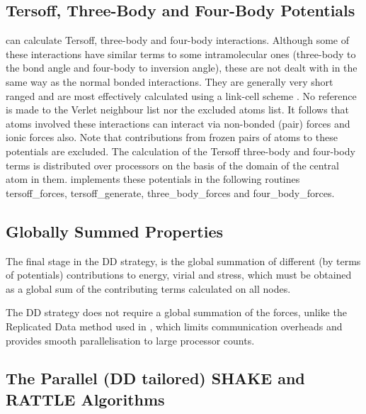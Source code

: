 \subsection{Tersoff, Three-Body and Four-Body Potentials}

\D can calculate Tersoff, three-body and four-body interactions.
Although some of these interactions have similar terms to some
intramolecular ones (three-body to the bond angle and four-body to
inversion angle), these are not dealt with in the same way as the
normal bonded interactions.  They are
generally very short ranged and are most effectively calculated
using a link-cell scheme \cite{hockney-81a}.  No reference is made
to the Verlet neighbour list nor the
excluded atoms list.  It follows that atoms involved these
interactions can interact via non-bonded (pair) forces and ionic
forces also.  Note that contributions from frozen pairs of atoms
to these potentials are excluded.  The calculation of the Tersoff
three-body and four-body terms is distributed over
processors on the basis of the domain of the central atom in them.
\D implements these potentials in the following routines
{\sc tersoff\_forces}, {\sc tersoff\_generate},
{\sc three\_body\_forces} and {\sc four\_body\_forces}.

\subsection{Globally Summed Properties}

The final stage in the DD strategy, is the global summation of
different (by terms of potentials) contributions to energy, virial
and stress, which must be obtained as a global sum of the
contributing terms calculated on all nodes.

The DD strategy does not require a global summation of the forces,
unlike the Replicated Data method used in \C, which
limits communication overheads and provides smooth parallelisation
to large processor counts.

\subsection{The Parallel (DD tailored) SHAKE and RATTLE Algorithms}

